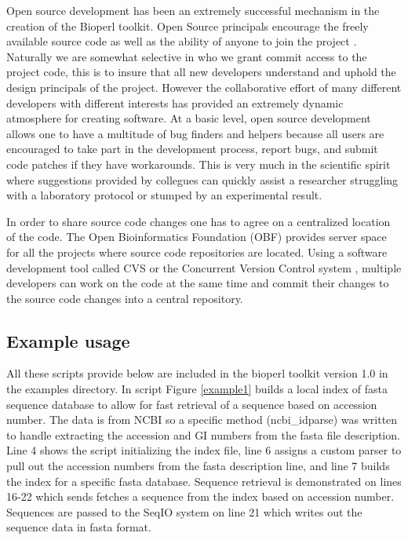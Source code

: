 \documentclass[12pt]{article}
\begin{document}
Open source development has been an extremely successful mechanism in
the creation of the Bioperl toolkit.  Open Source principals encourage
the freely available source code as well as the ability of anyone to
join the project \cite{cathedral}.  Naturally we are somewhat
selective in who we grant commit access to the project code, this is
to insure that all new developers understand and uphold the design
principals of the project.  However the collaborative effort of many
different developers with different interests has provided an
extremely dynamic atmosphere for creating software.  At a basic level,
open source development allows one to have a multitude of bug finders
and helpers because all users are encouraged to take part in the
development process, report bugs, and submit code patches if they have
workarounds.  This is very much in the scientific spirit where
suggestions provided by collegues can quickly assist a researcher
struggling with a laboratory protocol or stumped by an experimental
result.

In order to share source code changes one has to agree on a
centralized location of the code.  The Open Bioinformatics Foundation (OBF)
provides server space for all the projects where source code
repositories are located.  Using a software development tool called
CVS or the Concurrent Version Control system \cite{cvs,cvsbook}, multiple
developers can work on the code at the same time and commit their
changes to the source code changes into a central repository.  

\subsection{Example usage}

All these scripts provide below are included in the bioperl toolkit
version 1.0 in the examples directory.  In script Figure
\ref{example1}  builds a local index of fasta sequence database to
allow for fast retrieval of a sequence based on accession number.  The
data is from NCBI so a specific method (ncbi\_idparse) was written to
handle extracting the accession and GI numbers from the fasta file
description.  Line 4 shows the script initializing the index file,
line 6 assigns a custom parser to pull out the accession numbers from
the fasta description line, and line 7 builds the index for a specific
fasta database.  Sequence retrieval is demonstrated on lines 16-22
which sends fetches a sequence from the index based on accession
number.  Sequences are passed to the SeqIO system on line 21 which
writes out the sequence data in fasta format. 
\end{document}
